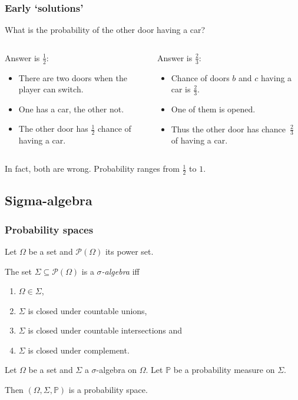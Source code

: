 \documentclass{beamer}
\theoremstyle{plain}
\theoremstyle{definition}
\theoremstyle{remark}
\renewcommand{\P}{\mathbb{P}}
\newcommand{\1}{\mathbbm{1}}
\begin{document}
\begin{frame}
\frametitle{Early `solutions'}
What is the probability of the other door having a car?

\begin{columns}
\begin{block}{Answer is $\frac{1}{2}$:}
\begin{itemize}
\item There are two doors when the player can switch.
\item One has a car, the other not.
\item The other door has $\frac{1}{2}$ chance of having a car.
\end{itemize}
\end{block}\pause
{}
\begin{block}{Answer is $\frac{2}{3}$:}
\begin{itemize}
\item Chance of doors $b$ and $c$ having a car is $\frac{2}{3}$.
\item One of them is opened.
\item Thus the other door has chance~$\frac{2}{3}$ of having a car.
\end{itemize}
\end{block}
\end{columns}\pause
\vspace{1em}
In fact, both are wrong. Probability ranges from $\frac{1}{2}$ to $1$.
\end{frame}
\subsection*{Sigma-algebra}
\begin{frame}
\frametitle{Probability spaces}
\begin{definition}
Let $\Omega$ be a set and $\mathcal{P}(\Omega)$ its power set.

The set $\Sigma\subseteq\mathcal{P}(\Omega)$ is a \emph{$\sigma$-algebra} iff
\begin{enumerate}
	\item $\Omega\in\Sigma$,
	\item $\Sigma$ is closed under countable unions,
	\item $\Sigma$ is closed under countable intersections and
	\item $\Sigma$ is closed under complement.
\end{enumerate}
\end{definition}
\pause
\begin{definition}
Let $\Omega$ be a set and $\Sigma$ a $\sigma$-algebra on $\Omega$. Let $\P$ be a probability measure on $\Sigma$.

Then $(\Omega,\Sigma,\P)$ is a probability space.
\end{definition}
\end{frame}
\end{document}
